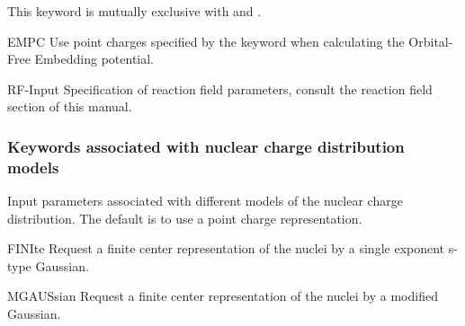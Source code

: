 \begin{keywordlist}
This keyword is mutually exclusive with  and .
\item[EMPC]
Use point charges specified by the keyword  when calculating the Orbital-Free Embedding potential.
\item[RF-Input]
Specification of reaction field parameters, consult the reaction field section of this manual.
\end{keywordlist}

\subsubsection{Keywords associated with nuclear charge distribution models}
Input parameters associated with different models of the nuclear charge distribution. The
default is to use a point charge representation.
\begin{keywordlist}
\item[FINIte]
Request a finite center representation of the nuclei by a single exponent s-type Gaussian.
\item[MGAUSsian]
Request a finite center representation of the nuclei by a modified Gaussian.
\end{keywordlist}

